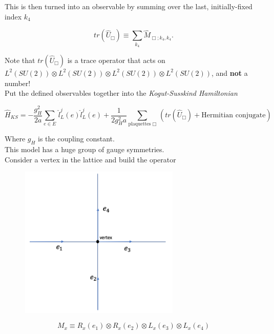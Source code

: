 \noindent This is then turned into an observable by summing over the last, initially-fixed index $k_4$

\begin{equation}
tr(\hat{U}_\Box) \equiv \sum_{k_4} \hat{M}_{\Box; k_4, k_4}.
\end{equation}

\noindent Note that $tr(\hat{U}_\Box)$ is a trace operator that acts on $L^2 (SU(2)) \otimes L^2 (SU(2)) \otimes L^2 (SU(2)) \otimes L^2 (SU(2))$, and \textbf{not} a number! \\

\noindent Put the defined observables together into the \textit{Kogut-Susskind Hamiltonian}

\begin{equation}
\hat{H}_{KS} = -\frac{g_H^2}{2a} \sum_{e \in E} \, \hat{l}_L^j (e) \hat{l}_L^j (e) + \frac{1}{2 g_H^2 a} \sum_{\text{plaquettes } \Box} \, \left(tr(\hat{U}_\Box) + \text{Hermitian conjugate} \right)
\end{equation}

\noindent Where $g_H$ is the coupling constant. \\

\noindent This model has a huge group of gauge symmetries. \\

\noindent Consider a vertex in the lattice and build the operator

\begin{figure}[H]
	\centering
	\includegraphics[width=3in]{images/ks_vertex.png}
	\caption*{}
\end{figure}

\begin{equation}
M_x \equiv R_x (e_1) \otimes R_x (e_2) \otimes L_x (e_3) \otimes L_x (e_4)
\end{equation}

